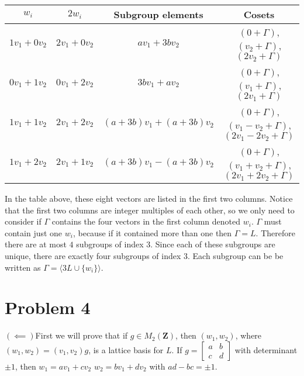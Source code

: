 \documentclass{article}
\begin{document}
\begin{table}[h!]
	\centering
	\begin{tabular}{|c|c|c|c|}
		\hline
		$w_i$      & $2w_i$ & Subgroup elements & Cosets \\ \hline
		$1v_1 + 0v_2$ & $2v_1 + 0v_2$ & $av_1 + 3bv_2$ & $(0 + \Gamma)$, $(v_2 + \Gamma)$, $(2v_2 + \Gamma)$  \\ \hline
		$0v_1 + 1v_2$ & $0v_1 + 2v_2$ & $3bv_1 + av_2$ & $(0 + \Gamma)$, $(v_1 + \Gamma)$, $(2v_1 + \Gamma)$  \\ \hline
		$1v_1 + 1v_2$ & $2v_1 + 2v_2$ & $(a+3b)v_1 + (a + 3b)v_2$ & $(0 + \Gamma)$, $(v_1-v_2 + \Gamma)$, $(2v_1-2v_2 + \Gamma)$  \\ \hline
		$1v_1 + 2v_2$ & $2v_1 + 1v_2$ & $(a+3b)v_1 - (a + 3b)v_2$ & $(0 + \Gamma)$, $(v_1+v_2 + \Gamma)$, $(2v_1+2v_2 + \Gamma)$  \\ \hline
	\end{tabular}
\end{table}

In the table above, these eight vectors are listed in the first two columns.
Notice that the first two columns are integer multiples of each other,
so we only need to consider if $\Gamma$ contains the four vectors 
in the first column denoted $w_i$.
$\Gamma$ must contain just one $w_i$, because 
if it contained more than one then $\Gamma = L$.
Therefore there are at most $4$ subgroups of index $3$.
Since each of these subgroups are unique,
there are exactly four subgroups of index $3$.
Each subgroup can be be written as $\Gamma =\langle 3L \cup \{w_i\} \rangle$.
\newpage

\section*{Problem 4}
$(\impliedby)$First we will prove that if $g \in M_2(\mathbf{Z})$,
then $(w_1, w_2)$, where $(w_1,w_2) = (v_1,v_2)g$,
is a lattice basis for $L$.
If $g = 
\begin{bmatrix}
	a & b \\
	c & d
\end{bmatrix}$ with determinant $\pm 1$,
then $w_1 = av_1 + cv_2$ $w_2 = bv_1 + dv_2$ with 
$ad-bc = \pm 1$.
\end{document}
